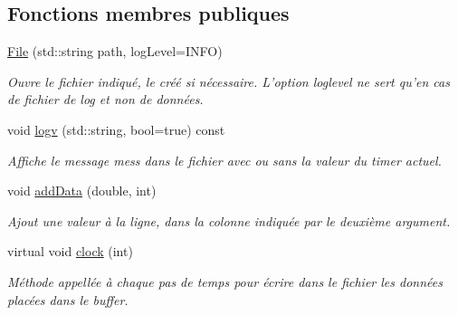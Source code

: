 \subsection*{Fonctions membres publiques}
\begin{DoxyCompactItemize}
\item 
\hypertarget{classFile_a85a14bb04d115aaa8e9b8be4069d98ee}{\hyperlink{classFile_a85a14bb04d115aaa8e9b8be4069d98ee}{File} (std\-::string path, log\-Level=I\-N\-F\-O)}\label{classFile_a85a14bb04d115aaa8e9b8be4069d98ee}

\begin{DoxyCompactList}\small\item\em Ouvre le fichier indiqué, le créé si nécessaire. L'option loglevel ne sert qu'en cas de fichier de log et non de données. \end{DoxyCompactList}\item 
\hypertarget{classFile_a72baa06dce43c7cbd82d25d357e4fa39}{void \hyperlink{classFile_a72baa06dce43c7cbd82d25d357e4fa39}{logv} (std\-::string, bool=true) const }\label{classFile_a72baa06dce43c7cbd82d25d357e4fa39}

\begin{DoxyCompactList}\small\item\em Affiche le message mess dans le fichier avec ou sans la valeur du timer actuel. \end{DoxyCompactList}\item 
\hypertarget{classFile_af80e9bf2fc24cd658b1849f0436f116c}{void \hyperlink{classFile_af80e9bf2fc24cd658b1849f0436f116c}{add\-Data} (double, int)}\label{classFile_af80e9bf2fc24cd658b1849f0436f116c}

\begin{DoxyCompactList}\small\item\em Ajout une valeur à la ligne, dans la colonne indiquée par le deuxième argument. \end{DoxyCompactList}\item 
\hypertarget{classFile_a0d228ae6ae9649a792092cf48625ccdf}{virtual void \hyperlink{classFile_a0d228ae6ae9649a792092cf48625ccdf}{clock} (int)}\label{classFile_a0d228ae6ae9649a792092cf48625ccdf}

\begin{DoxyCompactList}\small\item\em Méthode appellée à chaque pas de temps pour écrire dans le fichier les données placées dans le buffer. \end{DoxyCompactList}\end{DoxyCompactItemize}
